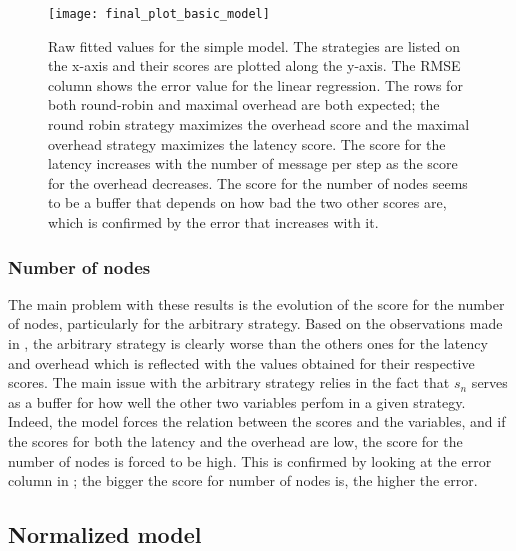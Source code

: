 \begin{figure}[h]
    \centering
    \texttt{[image: final\_plot\_basic\_model]}
    \caption{Raw fitted values for the simple model. The strategies are listed
    on the x-axis and their scores are plotted along the y-axis. The RMSE column shows the error value for the linear
        regression. The rows for both round-robin and maximal overhead are both
        expected; the round robin strategy maximizes the overhead score and the
        maximal overhead strategy maximizes the latency score. The score for the
        latency increases with the number of message per step as the score for
        the overhead decreases. The score for the number of nodes seems to be a
        buffer that depends on how bad the two other scores are, which is
        confirmed by the error that increases with it.
    }
    \label{fig:recapTestsPlot}
\end{figure}

\subsubsection{Number of nodes}
\label{ssec:nbNodes}
The main problem with these results is the evolution of the score for the number
of nodes, particularly for the arbitrary strategy. Based on the observations
made in , the arbitrary strategy is clearly worse than the
others ones for the latency and overhead which is reflected with the values
obtained for their respective scores. The main issue with the arbitrary strategy
relies in the fact that \(s_n\) serves as a buffer for how well the other two
variables perfom in a given strategy.  Indeed, the model forces the relation
between the scores and the variables, and if the scores for both the latency and
the overhead are low, the score for the number of nodes is forced to be high.
This is confirmed by looking at the error column in ; the
bigger the score for number of nodes is, the higher the error.  

\FloatBarrier
\subsection{Normalized model}

